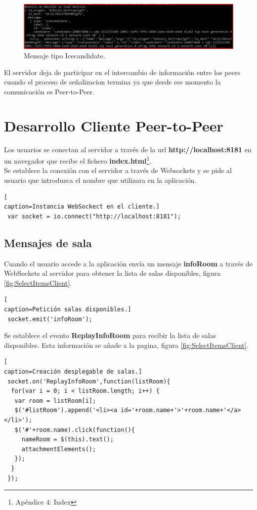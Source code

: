 \begin{figure}[!h]
\begin{center}
   \includegraphics[width=0.8\linewidth]{Figures/IceCandidateVideos}
	\decoRule
	\caption[Request/Replay conexión Servidor]{Mensaje tipo Icecandidate.}
\label{fig:IceCandidateVideos}
\end{center}
\end{figure}
El servidor deja de participar en el intercambio de información entre los peers cuando el proceso de señalizacion termina ya que desde ese momento la comunicación es Peer-to-Peer.
\section{Desarrollo Cliente Peer-to-Peer}
Los usuarios se conectan al servidor a través de la url \textbf{http://localhost:8181} en un navegador que recibe el fichero \textbf{index.html}\footnote{Apéndice 4: Index}.
\\Se establece la conexión con el servidor a través de Websockets y se pide al usuario que introduzca el nombre que utilizara en la aplicación.
\begin{lstlisting}[
caption=Instancia WebSockect en el cliente.]
 var socket = io.connect("http://localhost:8181");
\end{lstlisting}
\subsection*{Mensajes de sala}
Cuando el usuario accede a la aplicación envía un mensaje \textbf{infoRoom} a través de WebSockets al servidor para obtener la lista de salas disponibles, figura \ref{fig:SelectItemsClient}.
\begin{lstlisting}[
caption=Petición salas disponibles.]
 socket.emit('infoRoom');
\end{lstlisting}
Se establece el evento \textbf{ReplayInfoRoom} para recibir la lista de salas disponibles. Esta información se añade a la pagina, figura \ref{fig:SelectItemsClient}.
\begin{lstlisting}[
caption=Creación desplegable de salas.]
 socket.on('ReplayInfoRoom',function(listRoom){
  for(var i = 0; i < listRoom.length; i++) {
   var room = listRoom[i];
   $('#listRoom').append('<li><a id='+room.name+'>'+room.name+'</a></li>');
   $('#'+room.name).click(function(){
     nameRoom = $(this).text();
     attachmentElements();
   });
  }
 });
\end{lstlisting}
